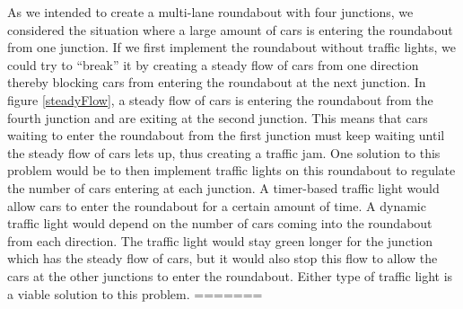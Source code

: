 \documentclass{article}
\begin{document}
    
As we intended to create a multi-lane roundabout with four junctions, we considered the situation where a large amount of cars is entering the roundabout from one junction. If we first implement the roundabout without traffic lights, we could try to ``break'' it by creating a steady flow of cars from one direction thereby blocking cars from entering the roundabout at the next junction. In figure \ref{steadyFlow}, a steady flow of cars is entering the roundabout from the fourth junction and are exiting at the second junction. This means that cars waiting to enter the roundabout from the first junction must keep waiting until the steady flow of cars lets up, thus creating a traffic jam. One solution to this problem would be to then implement traffic lights on this roundabout to regulate the number of cars entering at each junction. A timer-based traffic light would allow cars to enter the roundabout for a certain amount of time. A dynamic traffic light would depend on the number of cars coming into the roundabout from each direction. The traffic light would stay green longer for the junction which has the steady flow of cars, but it would also stop this flow to allow the cars at the other junctions to enter the roundabout. Either type of traffic light is a viable solution to this problem.
=======
\end{document}
